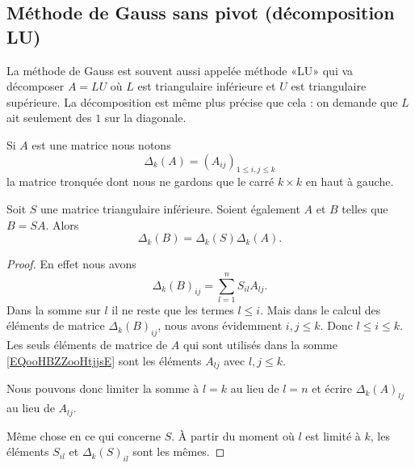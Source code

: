 \subsection{Méthode de Gauss sans pivot (décomposition LU)}

La méthode de Gauss est souvent aussi appelée méthode «LU» qui va décomposer \( A=LU\) où \( L\) est triangulaire inférieure et \( U\) est triangulaire supérieure. La décomposition est même plus précise que cela : on demande que \( L\) ait seulement des \( 1\) sur la diagonale.

Si \( A\) est une matrice nous notons
\begin{equation}
	\Delta_k(A)= (A_{ij})_{1\leq i,j\leq k}
\end{equation}
la matrice tronquée dont nous ne gardons que le carré \( k\times k\) en haut à gauche.

\begin{lemma}       \label{LEMooXEJFooGiYoyb}
	Soit \( S\) une matrice triangulaire inférieure. Soient également \( A\) et \( B\) telles que \( B=SA\). Alors
	\begin{equation}
		\Delta_k(B)=\Delta_k(S)\Delta_k(A).
	\end{equation}
\end{lemma}

\begin{proof}
	En effet nous avons
	\begin{equation}       \label{EQooHBZZooHtjjsE}
		\Delta_k(B)_{ij}=\sum_{l=1}^nS_{il}A_{lj}.
	\end{equation}
	Dans la somme sur \( l\) il ne reste que les termes \( l\leq i\). Mais dans le calcul des éléments de matrice \( \Delta_k(B)_{ij}\), nous avons évidemment \( i,j\leq k\). Donc \( l\leq i\leq k\). Les seuls éléments de matrice de \( A\) qui sont utilisés dans la somme \eqref{EQooHBZZooHtjjsE} sont les éléments \( A_{lj}\) avec \( l,j\leq k\).

	Nous pouvons donc limiter la somme à \( l=k\) au lieu de \( l=n\) et écrire \( \Delta_k(A)_{lj}\) au lieu de \( A_{lj}\).

	Même chose en ce qui concerne \( S\). À partir du moment où \( l\) est limité à \( k\), les éléments \( S_{il}\) et \( \Delta_k(S)_{il}\) sont les mêmes.
\end{proof}

